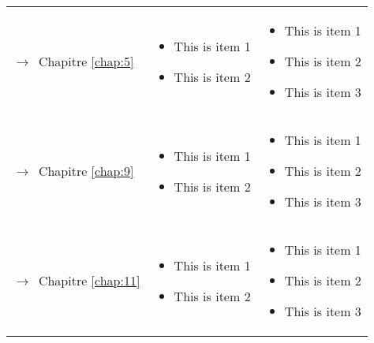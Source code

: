 \begin{tabular}{L{5cm}L{4.5cm}L{4.5cm}}
{\par\footnotesize\hspace{.25cm}$\longrightarrow$~Chapitre
\ref{chap:5}} & \begin{minipage}{4cm}
    \begin{itemize}
    \item This is item 1
    \item This is item 2
    \end{itemize}
  \end{minipage}& \begin{minipage}{4cm}
    \begin{itemize}
    \item This is item 1
    \item This is item 2
    \item This is item 3
    \end{itemize}
  \end{minipage} \\
  
{\par\footnotesize\hspace{.25cm}$\longrightarrow$~Chapitre
\ref{chap:9}} & \begin{minipage}{4cm}
    \begin{itemize}
    \item This is item 1
    \item This is item 2
    \end{itemize}
  \end{minipage}& \begin{minipage}{4cm}
    \begin{itemize}
    \item This is item 1
    \item This is item 2
    \item This is item 3
    \end{itemize}
  \end{minipage} \\
  
{\par\footnotesize\hspace{.25cm}$\longrightarrow$~Chapitre
\ref{chap:11}} & \begin{minipage}{4cm}
    \begin{itemize}
    \item This is item 1
    \item This is item 2
    \end{itemize}
  \end{minipage}& \begin{minipage}{4cm}
    \begin{itemize}
    \item This is item 1
    \item This is item 2
    \item This is item 3
    \end{itemize}
  \end{minipage}\\
  
  \bottomrule
\end{tabular}
